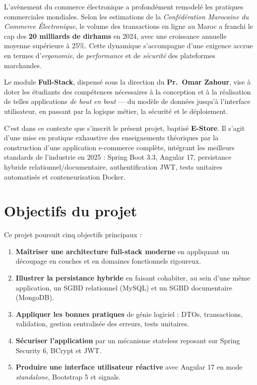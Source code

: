 \documentclass[11pt,a4paper,oneside]{report}
\begin{document}
L'avènement du commerce électronique a profondément remodelé les pratiques
commerciales mondiales. Selon les estimations de la
\textit{Confédération Marocaine du Commerce Électronique}, le volume des
transactions en ligne au Maroc a franchi le cap des \textbf{20 milliards de
dirhams} en 2024, avec une croissance annuelle moyenne supérieure à 25\%.
Cette dynamique s'accompagne d'une exigence accrue en termes
d'\textit{ergonomie}, de \textit{performance} et de \textit{sécurité} des
plateformes marchandes.

Le module \textbf{Full-Stack}, dispensé sous la direction du
\textbf{Pr.\ Omar Zahour}, vise à doter les étudiants des compétences
nécessaires à la conception et à la réalisation de telles applications
\textit{de bout en bout} — du modèle de données jusqu'à l'interface
utilisateur, en passant par la logique métier, la sécurité et le
déploiement.

C'est dans ce contexte que s'inscrit le présent projet, baptisé
\textbf{E-Store}. Il s'agit d'une mise en pratique exhaustive des
enseignements théoriques par la construction d'une application e-commerce
complète, intégrant les meilleurs standards de l'industrie en 2025 :
Spring Boot 3.3, Angular 17, persistance hybride relationnel/documentaire,
authentification JWT, tests unitaires automatisés et conteneurisation
Docker.

\section*{Objectifs du projet}

Ce projet poursuit cinq objectifs principaux :

\begin{enumerate}
  \item \textbf{Maîtriser une architecture full-stack moderne} en
    appliquant un découpage en couches et en domaines fonctionnels rigoureux.
  \item \textbf{Illustrer la persistance hybride} en faisant cohabiter, au
    sein d'une même application, un SGBD relationnel (MySQL) et un SGBD
    documentaire (MongoDB).
  \item \textbf{Appliquer les bonnes pratiques} de génie logiciel : DTOs,
    transactions, validation, gestion centralisée des erreurs, tests unitaires.
  \item \textbf{Sécuriser l'application} par un mécanisme stateless reposant
    sur Spring Security 6, BCrypt et JWT.
  \item \textbf{Produire une interface utilisateur réactive} avec Angular 17
    en mode \textit{standalone}, Bootstrap 5 et signals.
\end{enumerate}
\end{document}
